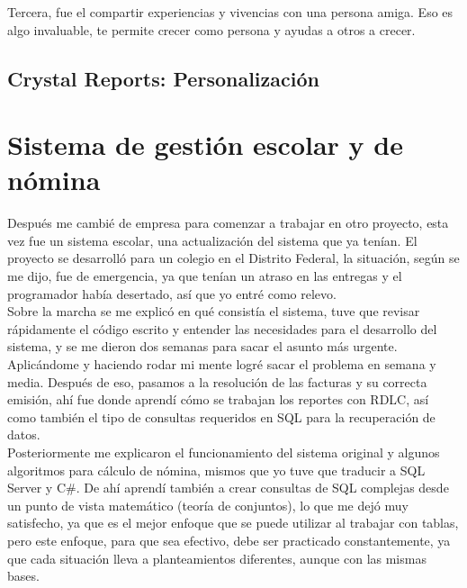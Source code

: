 \documentclass[12pt,spanish,lettersize]{book}
\begin{document}
Tercera, fue el compartir experiencias y vivencias con una persona amiga. Eso es algo invaluable, te permite crecer como persona y ayudas a otros a crecer.\\
\subsection{Crystal Reports: Personalización}
\section{Sistema de gestión escolar y de nómina}

Después me cambié de empresa para comenzar a trabajar en otro proyecto, esta vez fue un sistema escolar, una actualización del sistema que ya tenían. El proyecto se desarrolló para un colegio en el Distrito Federal, la situación, según se me dijo, fue de emergencia, ya que tenían un atraso en las entregas y el programador había desertado, así que yo entré como relevo.\\

Sobre la marcha se me explicó en qué consistía el sistema, tuve que revisar rápidamente el código escrito y entender las necesidades para el desarrollo del sistema, y se me dieron dos semanas para sacar el asunto más urgente. Aplicándome y haciendo rodar mi mente logré sacar el problema en semana y media. Después de eso, pasamos a la resolución de las facturas y su correcta emisión, ahí fue donde aprendí cómo se trabajan los reportes con RDLC, así como también el tipo de consultas requeridos en SQL para la recuperación de datos.\\

Posteriormente me explicaron el funcionamiento del sistema original y algunos algoritmos para cálculo de nómina, mismos que yo tuve que traducir a SQL Server y C\#. De ahí aprendí también a crear consultas de SQL complejas desde un punto de vista matemático (teoría de conjuntos), lo que me dejó muy satisfecho, ya que es el mejor enfoque que se puede utilizar al trabajar con tablas, pero este enfoque, para que sea efectivo, debe ser practicado constantemente, ya que cada situación lleva a planteamientos diferentes, aunque con las mismas bases.\\
\end{document}
